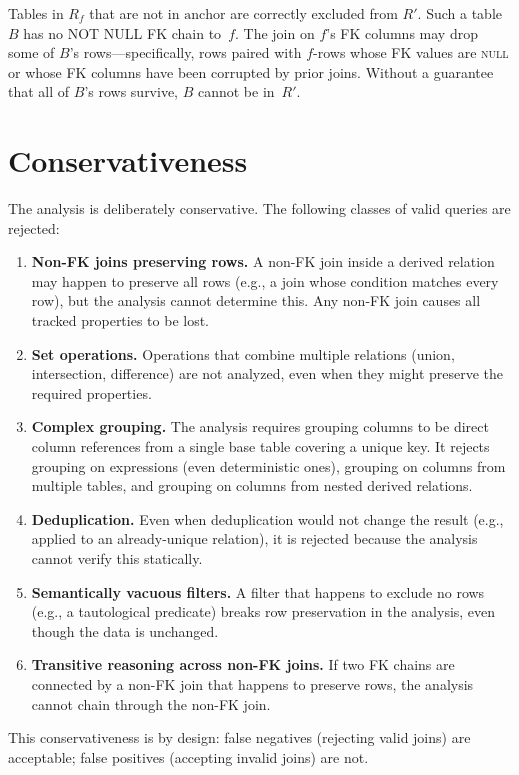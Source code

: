 \documentclass[11pt]{article}
\theoremstyle{definition}
\newcommand{\Rf}{R_f}
\newcommand{\anchor}{\mathrm{anchor}}
\begin{document}
Tables in $\Rf$ that are not in $\anchor$ are correctly excluded from
$R'$.  Such a table~$B$ has no NOT NULL FK chain to~$f$.  The join on
$f$'s FK columns may drop some of $B$'s rows---specifically, rows
paired with $f$-rows whose FK values are \textsc{null} or whose FK
columns have been corrupted by prior joins.  Without a guarantee that
all of $B$'s rows survive, $B$ cannot be in~$R'$.


\section{Conservativeness}

The analysis is deliberately conservative.  The following classes of
valid queries are rejected:

\begin{enumerate}
\item \textbf{Non-FK joins preserving rows.}\;
  A non-FK join inside a derived relation may happen to preserve all
  rows (e.g., a join whose condition matches every row), but the
  analysis cannot determine this.  Any non-FK join causes all tracked
  properties to be lost.

\item \textbf{Set operations.}\;
  Operations that combine multiple relations (union, intersection,
  difference) are not analyzed, even when they might preserve the
  required properties.

\item \textbf{Complex grouping.}\;
  The analysis requires grouping columns to be direct column
  references from a single base table covering a unique key.  It
  rejects grouping on expressions (even deterministic ones), grouping
  on columns from multiple tables, and grouping on columns from nested
  derived relations.

\item \textbf{Deduplication.}\;
  Even when deduplication would not change the result (e.g., applied
  to an already-unique relation), it is rejected because the analysis
  cannot verify this statically.

\item \textbf{Semantically vacuous filters.}\;
  A filter that happens to exclude no rows (e.g., a tautological
  predicate) breaks row preservation in the analysis, even though the
  data is unchanged.

\item \textbf{Transitive reasoning across non-FK joins.}\;
  If two FK chains are connected by a non-FK join that happens to
  preserve rows, the analysis cannot chain through the non-FK join.
\end{enumerate}

This conservativeness is by design: false negatives (rejecting valid
joins) are acceptable; false positives (accepting invalid joins) are
not.
\end{document}
